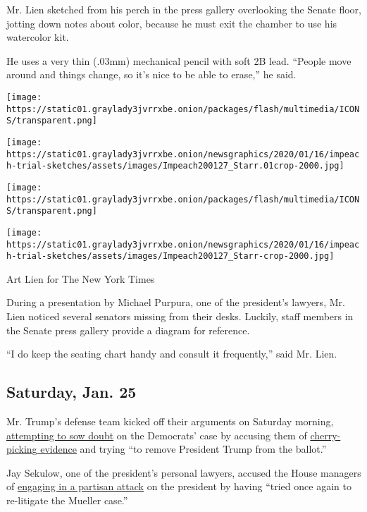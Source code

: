 Mr. Lien sketched from his perch in the press gallery overlooking the
Senate floor, jotting down notes about color, because he must exit the
chamber to use his watercolor kit.

He uses a very thin (.03mm) mechanical pencil with soft 2B lead.
``People move around and things change, so it's nice to be able to
erase,'' he said.

\texttt{[image: https://static01.graylady3jvrrxbe.onion/packages/flash/multimedia/ICONS/transparent.png]}

\texttt{[image: https://static01.graylady3jvrrxbe.onion/newsgraphics/2020/01/16/impeach-trial-sketches/assets/images/Impeach200127\_Starr.01crop-2000.jpg]}

\texttt{[image: https://static01.graylady3jvrrxbe.onion/packages/flash/multimedia/ICONS/transparent.png]}

\texttt{[image: https://static01.graylady3jvrrxbe.onion/newsgraphics/2020/01/16/impeach-trial-sketches/assets/images/Impeach200127\_Starr-crop-2000.jpg]}

Art Lien for The New York Times

During a presentation by Michael Purpura, one of the president's
lawyers, Mr. Lien noticed several senators missing from their desks.
Luckily, staff members in the Senate press gallery provide a diagram for
reference.

``I do keep the seating chart handy and consult it frequently,'' said
Mr. Lien.

\hypertarget{saturday-jan-25}{%
\subsection{Saturday, Jan. 25}\label{saturday-jan-25}}

Mr. Trump's defense team kicked off their arguments on Saturday morning,
\href{https://www.nytimes3xbfgragh.onion/live/2020/impeachment-trial-live-01-25/trumps-defense-team-seeks-to-sow-reasonable-doubt\#live-blog-list}{attempting
to sow doubt} on the Democrats' case by accusing them of
\href{https://www.nytimes3xbfgragh.onion/live/2020/impeachment-trial-live-01-25/cipollone-leads-off-for-white-house-legal-team\#live-blog-list}{cherry-picking
evidence} and trying ``to remove President Trump from the ballot.''

Jay Sekulow, one of the president's personal lawyers, accused the House
managers of
\href{https://www.nytimes3xbfgragh.onion/live/2020/impeachment-trial-live-01-25/lawyers-zero-in-on-the-mueller-inquiry\#live-blog-list}{engaging
in a partisan attack} on the president by having ``tried once again to
re-litigate the Mueller case.''

